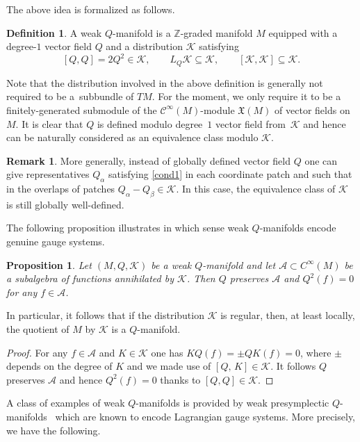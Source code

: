 \documentclass[10pt,a4paper]{amsart}
\numberwithin{equation}{section}
\newtheorem{Proposition}[Theorem]{Proposition}
\theoremstyle{definition}
\newtheorem{Definition}[Theorem]{Definition}
\newtheorem{Remark}[Theorem]{Remark}
\newcommand{\commut}[2]{[#1{,}\,#2]}
\newcommand{\cC}{\mathcal{C}}
\def\cK{\mathcal{K}}
\begin{document}
The above idea is formalized as follows.

\begin{Definition}
 A weak $Q$-manifold is a $\mathbb{Z}$-graded manifold $M$ equipped with a degree-$1$ vector field $Q$ and a distribution $\mathcal{K}$ satisfying
\begin{equation}\label{cond1}
 [Q,Q]=2Q^2\in \mathcal{K},\qquad L_Q\mathcal{K}\subseteq \mathcal{K},\qquad [\mathcal{K},\mathcal{K}]\subseteq \mathcal{K}.
\end{equation}
\end{Definition}
Note that the distribution involved in the above definition is generally not required to be a~subbundle of $TM$. For the moment, we only require it to be a finitely-generated submodule of the $\cC^\infty(M)$-module $\mathfrak{X}(M)$ of vector fields on $M$. It is clear that $Q$ is defined modulo degree~$1$ vector field from~$\cK$ and hence can be naturally considered as an equivalence class modulo $\cK$.
\begin{Remark}
 More generally, instead of globally defined vector field $Q$ one can give representatives $Q_\alpha$ satisfying \eqref{cond1} in each coordinate patch and such that in the overlaps of patches $Q_\alpha-Q_\beta \in \cK$. In this case, the equivalence class of $\cK$ is still globally well-defined.
\end{Remark}


The following proposition illustrates in which sense weak $Q$-manifolds encode
genuine gauge systems.

\begin{Proposition}\label{prop1}
 Let $(M,Q,\mathcal{K})$ be a weak $Q$-manifold and let $\mathcal{A}\subset C^{\infty}(M)$ be a subalgebra of functions annihilated by $\mathcal{K}$. Then $Q$ preserves $\mathcal{A}$ and $Q^2(f)=0$ for any $f\in\mathcal{A}$.
\end{Proposition}
In particular, it follows that if the distribution $\mathcal{K}$ is regular, then, at least locally, the quotient of $M$ by $\mathcal{K}$ is a $Q$-manifold.

\begin{proof}
For any $f\in\mathcal{A}$ and $K\in\mathcal{K}$ one has $KQ(f)=\pm QK(f)=0$, where $\pm$ depends on the degree of $K$ and we made use of $\commut{Q}{K}\in \cK$. It follows $Q$ preserves $\mathcal{A}$ and hence $Q^2(f)=0$ thanks to $[Q,Q]\in \mathcal{K}$.
\end{proof}

A class of examples of weak $Q$-manifolds is provided by weak presymplectic $Q$-manifolds~{\cite{Dneprov:2024cvt, Grigoriev:2022zlq}} which are known to encode Lagrangian gauge systems. More precisely, we have the following.
\end{document}
